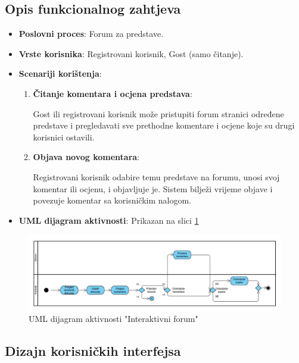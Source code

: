 \sloppy

\subsection{Opis funkcionalnog zahtjeva}

\begin{itemize}
    \item \textbf{Poslovni proces}:  Forum za predstave.
    \item \textbf{Vrste korisnika}: Registrovani korisnik, Gost (samo čitanje).
    \item \textbf{Scenariji korištenja}:
    \begin{enumerate}
        \item \textbf{Čitanje komentara i ocjena predstava}: 

        
        Gost ili registrovani korisnik može pristupiti forum stranici određene predstave i pregledavati sve prethodne komentare i ocjene koje su drugi korisnici ostavili.
        
        \item \textbf{Objava novog komentara}: 

        
        Registrovani korisnik odabire temu predstave na forumu, unosi svoj komentar ili ocjenu, i objavljuje je. Sistem bilježi vrijeme objave i povezuje komentar sa korisničkim nalogom.
    \end{enumerate}
    \item \textbf{UML dijagram aktivnosti}: Prikazan na slici \ref{fig:fz4}
\end{itemize}

\begin{figure}[H]
    \centering
    \includegraphics[width=1\textwidth]{Slike/Fz4.png}
    \caption{UML dijagram aktivnosti "Interaktivni forum"}
    \label{fig:fz4}
\end{figure}

\sloppy

\subsection{Dizajn korisničkih interfejsa}

